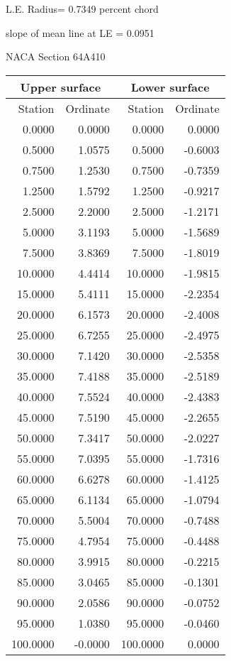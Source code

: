 \documentclass[11pt]{book}
\begin{document}
L.E. Radius=  0.7349 percent chord


 slope of mean line at LE =  0.0951
 \newpage
  \label{s64A410}
 \begin{Large}
 NACA Section 64A410
 \end{Large}
  
 \vspace{8mm}
 \begin{tabular}{|r|r|r|r|} \hline 
 \multicolumn{2}{|c|}{Upper surface} & \multicolumn{2}{|c|}{Lower surface} \\
 \hline
 Station & Ordinate & Station & Ordinate \\
 \hline
0.0000 & 0.0000 & 0.0000 & 0.0000 \\
0.5000 & 1.0575 & 0.5000 & -0.6003 \\
0.7500 & 1.2530 & 0.7500 & -0.7359 \\
1.2500 & 1.5792 & 1.2500 & -0.9217 \\
2.5000 & 2.2000 & 2.5000 & -1.2171 \\
5.0000 & 3.1193 & 5.0000 & -1.5689 \\
7.5000 & 3.8369 & 7.5000 & -1.8019 \\
10.0000 & 4.4414 & 10.0000 & -1.9815 \\
15.0000 & 5.4111 & 15.0000 & -2.2354 \\
20.0000 & 6.1573 & 20.0000 & -2.4008 \\
25.0000 & 6.7255 & 25.0000 & -2.4975 \\
30.0000 & 7.1420 & 30.0000 & -2.5358 \\
35.0000 & 7.4188 & 35.0000 & -2.5189 \\
40.0000 & 7.5524 & 40.0000 & -2.4383 \\
45.0000 & 7.5190 & 45.0000 & -2.2655 \\
50.0000 & 7.3417 & 50.0000 & -2.0227 \\
55.0000 & 7.0395 & 55.0000 & -1.7316 \\
60.0000 & 6.6278 & 60.0000 & -1.4125 \\
65.0000 & 6.1134 & 65.0000 & -1.0794 \\
70.0000 & 5.5004 & 70.0000 & -0.7488 \\
75.0000 & 4.7954 & 75.0000 & -0.4488 \\
80.0000 & 3.9915 & 80.0000 & -0.2215 \\
85.0000 & 3.0465 & 85.0000 & -0.1301 \\
90.0000 & 2.0586 & 90.0000 & -0.0752 \\
95.0000 & 1.0380 & 95.0000 & -0.0460 \\
100.0000 & -0.0000 & 100.0000 & 0.0000 \\
 \hline 
 \end{tabular}
\end{document}
